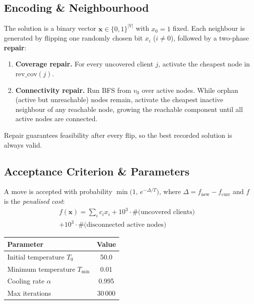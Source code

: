 \documentclass[10pt,a4paper,twocolumn]{article}
\begin{document}
\subsection{Encoding \& Neighbourhood}

The solution is a binary vector $\mathbf{x}\in\{0,1\}^{|V|}$ with
$x_0=1$ fixed. Each neighbour is generated by flipping one randomly
chosen bit $x_i$ ($i\neq 0$), followed by a two-phase \textbf{repair}:

\begin{enumerate}
  \item \textbf{Coverage repair.} For every uncovered client $j$,
        activate the cheapest node in $\mathrm{rev\_cov}(j)$.
  \item \textbf{Connectivity repair.} Run BFS from $v_0$ over active
        nodes. While orphan (active but unreachable) nodes remain,
        activate the cheapest inactive neighbour of any reachable node,
        growing the reachable component until all active nodes are
        connected.
\end{enumerate}

\noindent Repair guarantees feasibility after every flip, so the best
recorded solution is always valid.

\subsection{Acceptance Criterion \& Parameters}

A move is accepted with probability
$\min\!\bigl(1,\,e^{-\Delta/T}\bigr)$,
where $\Delta = f_{\text{new}} - f_{\text{curr}}$ and $f$ is the
\emph{penalised cost}:
\begin{multline*}
  f(\mathbf{x}) = \textstyle\sum_i c_i x_i
    + 10^3\!\cdot\!\#\text{(uncovered clients)}\\
    + 10^3\!\cdot\!\#\text{(disconnected active nodes)}
\end{multline*}

\begin{center}
\renewcommand{\arraystretch}{1.12}
\fontsize{7.5pt}{9pt}\selectfont
\begin{tabular}{@{}lc@{}}
\toprule
\textbf{Parameter} & \textbf{Value} \\
\midrule
Initial temperature $T_0$  & 50.0   \\
Minimum temperature $T_{\min}$ & 0.01 \\
Cooling rate $\alpha$      & 0.995  \\
Max iterations             & 30\,000 \\
\bottomrule
\end{tabular}
\end{center}
\end{document}
